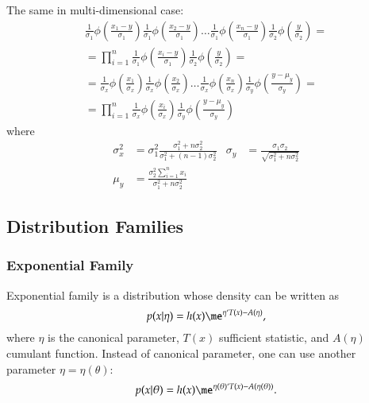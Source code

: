 \documentclass[a4paper]{article}
\numberwithin{equation}{subsection}
\begin{document}
The same in multi-dimensional case:
\begin{multline}
  \frac{1}{\sigma_1}\phi\left( \frac{x_{1} - y}{\sigma_1} \right)
  \frac{1}{\sigma_1}\phi\left( \frac{x_{2} - y}{\sigma_1} \right)
  \dots
  \frac{1}{\sigma_1}\phi\left( \frac{x_{n} - y}{\sigma_1} \right)
  \frac{1}{\sigma_2}\phi\left( \frac{y}{\sigma_2} \right) 
  =
  \\
  =
  \prod_{i=1}^{n}
  \frac{1}{\sigma_1}\phi\left( \frac{x_{i} - y}{\sigma_1} \right)
  \frac{1}{\sigma_2}\phi\left( \frac{y}{\sigma_2} \right) 
  =
  \\
  =
  \frac{1}{\sigma_x}\phi\left( \frac{x_{1}}{\sigma_x} \right)
  \frac{1}{\sigma_x}\phi\left( \frac{x_{2}}{\sigma_x} \right)
  \dots
  \frac{1}{\sigma_x}\phi\left( \frac{x_{n}}{\sigma_x} \right)
  \frac{1}{\sigma_y}\phi\left( \frac{y-\mu_y}{\sigma_y} \right)
  =
  \\
  =
  \prod_{i=1}^{n}
  \frac{1}{\sigma_x}\phi\left( \frac{x_{i}}{\sigma_x} \right)
  \frac{1}{\sigma_y}\phi\left( \frac{y-\mu_y}{\sigma_y} \right)
  \label{eq:normaaljaotuste_korrutis}
\end{multline}
where
\begin{align*}
  \sigma_x^{2}
  &= 
  \sigma_{1}^{2}
  \frac{\sigma_1^2 + n \sigma_2^2}
  {\sigma_1^2 + (n - 1) \sigma_2^2}
  &
  \sigma_y 
  &= 
  \frac{\sigma_1 \sigma_2}
  {\sqrt{\sigma_1^2 + n \sigma_2^2}} 
  \\
  \mu_y 
  &=
  \frac{\sigma_2^2 \sum_{i=1}^{n} x_{i}}{\sigma_1^2 + n \sigma_2^2}
\end{align*}


\subsection{Distribution Families}

\subsubsection{Exponential Family}
\label{sec:exponential_family}

Exponential family is a distribution whose density can be written as
\begin{equation}
  \label{eq:exponential_family_density}
  p(x|\eta) = h(x) \me^{\eta` T(x) - A(\eta)},
\end{equation}
where $\eta$ is the canonical parameter, $T(x)$ sufficient statistic,
and $A(\eta)$ cumulant function.  Instead of canonical parameter, one
can use another parameter $\eta = \eta(\theta)$:
\begin{equation}
  \label{eq:exponential_family_other_param}
  p(x|\theta) = h(x) \me^{\eta(\theta)` T(x) - A(\eta(\theta))}.
\end{equation}
\end{document}
